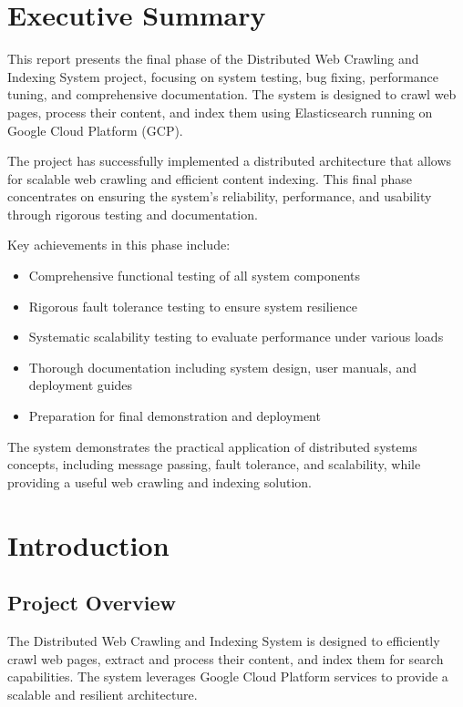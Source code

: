 \documentclass[12pt,a4paper]{report}
\begin{document}
\tableofcontents
\listoffigures
\listoftables

\chapter{Executive Summary}

This report presents the final phase of the Distributed Web Crawling and Indexing System project, focusing on system testing, bug fixing, performance tuning, and comprehensive documentation. The system is designed to crawl web pages, process their content, and index them using Elasticsearch running on Google Cloud Platform (GCP).

The project has successfully implemented a distributed architecture that allows for scalable web crawling and efficient content indexing. This final phase concentrates on ensuring the system's reliability, performance, and usability through rigorous testing and documentation.

Key achievements in this phase include:
\begin{itemize}
    \item Comprehensive functional testing of all system components
    \item Rigorous fault tolerance testing to ensure system resilience
    \item Systematic scalability testing to evaluate performance under various loads
    \item Thorough documentation including system design, user manuals, and deployment guides
    \item Preparation for final demonstration and deployment
\end{itemize}

The system demonstrates the practical application of distributed systems concepts, including message passing, fault tolerance, and scalability, while providing a useful web crawling and indexing solution.

\chapter{Introduction}

\section{Project Overview}
The Distributed Web Crawling and Indexing System is designed to efficiently crawl web pages, extract and process their content, and index them for search capabilities. The system leverages Google Cloud Platform services to provide a scalable and resilient architecture.
\end{document}
